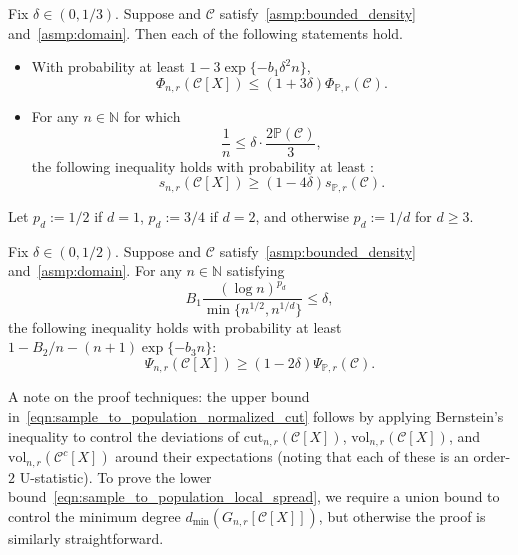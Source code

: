 \documentclass[11pt,twoside]{article}
\newcommand{\1}{\mathbf{1}}
\newcommand{\mc}[1]{\mathcal{#1}}
\newcommand{\mbb}[1]{\mathbb{#1}}
\newcommand{\Pbb}{\mathbb{P}}
\newcommand{\wt}[1]{\widetilde{#1}}
\newcommand{\vol}{\mathrm{vol}}
\newcommand{\cut}{\mathrm{cut}}
\begin{document}
\begin{proposition}
	\label{prop:sample_to_population_1}
	Fix $\delta \in (0,1/3)$. Suppose \smash{$\wt{\Pbb}$} and $\mc{C}$ satisfy~\ref{asmp:bounded_density} and~\ref{asmp:domain}. Then each of the following statements hold.
	\begin{itemize}
		\item With probability at least $1 - 3\exp\{-b_1\delta^2n\}$,
		\begin{equation}
		\label{eqn:sample_to_population_normalized_cut}
		\Phi_{n,r}(\mc{C}[X]) \leq (1 + 3\delta) \Phi_{\Pbb,r}(\mc{C}).
		\end{equation}
		\item For any $n \in \mbb{N}$ for which 
		\begin{equation}
		\label{eqn:sample_to_population_local_spread_sample_complexity}
		\frac{1}{n} \leq \delta \cdot \frac{2\Pbb(\mc{C})}{3},
		\end{equation}
		the following inequality holds with probability at least :
		\begin{equation}
		\label{eqn:sample_to_population_local_spread}
		s_{n,r}(\mc{C}[X]) \geq (1 - 4\delta) s_{\Pbb,r}(\mc{C}).
		\end{equation}
	\end{itemize}
\end{proposition}
Let $p_d := 1/2$ if $d = 1$, $p_d := 3/4$ if $d = 2$, and otherwise $p_d := 1/d$ for $d \geq 3$. 
\begin{proposition}
	\label{prop:sample_to_population_2}
	Fix $\delta \in (0,1/2)$. Suppose \smash{$\wt{\Pbb}$} and $\mc{C}$ satisfy~\ref{asmp:bounded_density} and~\ref{asmp:domain}. For any $n \in \mbb{N}$ satisfying
	\begin{equation}
	\label{eqn:sample_to_population_conductance_sample_complexity}
	B_1 \frac{(\log n)^{p_d}}{\min\{n^{1/2},n^{1/d}\}} \leq \delta,
	\end{equation}
	the following inequality holds with probability at least $1 - B_2/n - (n + 1)\exp\{-b_3n\}$:
	\begin{equation}
	\label{eqn:sample_to_population_conductance}
	\Psi_{n,r}(\mc{C}[X]) \geq (1 - 2\delta) \Psi_{\Pbb,r}(\mc{C}).
	\end{equation}
\end{proposition}

A note on the proof techniques: the upper bound in~\eqref{eqn:sample_to_population_normalized_cut} follows by applying Bernstein's inequality to control the deviations of $\cut_{n,r}(\mc{C}[X])$, $\vol_{n,r}(\mc{C}[X])$, and $\vol_{n,r}(\mc{C}^c[X])$ around their expectations (noting that each of these is an order-$2$ U-statistic). To prove the lower bound~\eqref{eqn:sample_to_population_local_spread}, we require a union bound to control the minimum degree $d_{\min}(G_{n,r}[\mc{C}[X]])$, but otherwise the proof is similarly straightforward. 
\end{document}
